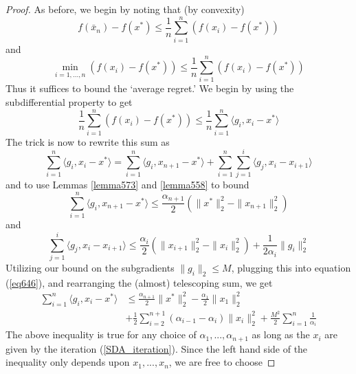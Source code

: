 \begin{proof}
 As before, we begin by noting that (by convexity)
 \begin{equation}
  f(\bar{x}_n) - f(x^*) \leq \frac{1}{n}\displaystyle\sum_{i = 1}^n (f(x_i) - f(x^*))
 \end{equation}
 and
 \begin{equation}
  \min_{i = 1,...,n} (f(x_i) - f(x^*)) \leq \frac{1}{n}\displaystyle\sum_{i = 1}^n (f(x_i) - f(x^*))
 \end{equation}
 Thus it suffices to bound the `average regret.' We begin by using the subdifferential property to get
 \begin{equation}
  \frac{1}{n}\displaystyle\sum_{i = 1}^n (f(x_i) - f(x^*)) \leq 
  \frac{1}{n}\displaystyle\sum_{i = 1}^n \langle g_i, x_i - x^*\rangle
 \end{equation}
 The trick is now to rewrite this sum as
 \begin{equation}\label{eq646}
  \displaystyle\sum_{i = 1}^n \langle g_i, x_i - x^*\rangle = 
  \displaystyle\sum_{i = 1}^n \langle g_i, x_{n+1} - x^*\rangle + \displaystyle\sum_{i = 1}^n \displaystyle\sum_{j = 1}^i\langle g_j, x_i - x_{i+1}\rangle
 \end{equation}
 and to use Lemmas \ref{lemma573} and \ref{lemma558} to bound
 \begin{equation}
  \displaystyle\sum_{i = 1}^n \langle g_i, x_{n+1} - x^*\rangle \leq \frac{\alpha_{n+1}}{2}(\|x^*\|_2^2 - \|x_{n+1}\|_2^2)
 \end{equation}
 and
 \begin{equation}
  \displaystyle\sum_{j = 1}^i\langle g_j, x_i - x_{i+1}\rangle \leq \frac{\alpha_{i}}{2}(\|x_{i+1}\|_2^2 - \|x_i\|_2^2) + \frac{1}{2\alpha_{i}} \|g_i\|_2^2
 \end{equation}
 Utilizing our bound on the subgradients $\|g_i\|_2\leq M$, plugging this into equation (\ref{eq646}), and rearranging
 the (almost) telescoping sum, we get
 \begin{align}
  \displaystyle\sum_{i = 1}^n \langle g_i, x_i - x^*\rangle &\leq \frac{\alpha_{n+1}}{2}\|x^*\|_2^2 - \frac{\alpha_1}{2}\|x_1\|_2^2 \\
  &+ \frac{1}{2}\displaystyle\sum_{i = 2}^{n+1}(\alpha_{i - 1} - \alpha_{i}) \|x_i\|_2^2 + \frac{M^2}{2}\displaystyle\sum_{i = 1}^n\frac{1}{\alpha_{i}} 
 \end{align}
 The above inequality is true for any choice of $\alpha_1,...,\alpha_{n+1}$ as long as the $x_i$ are given by the iteration
 (\ref{SDA_iteration}). Since the left hand side of the inequality only depends upon $x_1,...,x_n$, we are free to choose

\end{proof}
